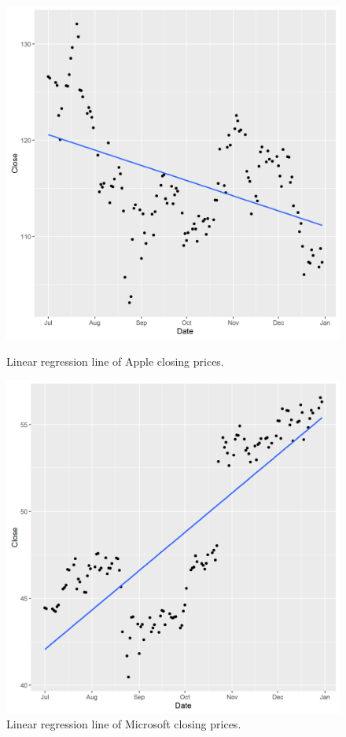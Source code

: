 \documentclass[paper=a4, fontsize=11pt]{scrartcl} %
\numberwithin{equation}{section} %
\numberwithin{figure}{section} %
\numberwithin{table}{section} %
\begin{document}
\begin{figure}[!htb]
  \includegraphics[width=\linewidth]{graph/a_reg10.png}
  \caption{Linear regression line of Apple closing prices.}
\endminipage\hfill
{}
  \includegraphics[width=\linewidth]{graph/m_reg10.png}
  \caption{Linear regression line of Microsoft closing prices.}
\endminipage\hfill
\end{figure}
\end{document}
